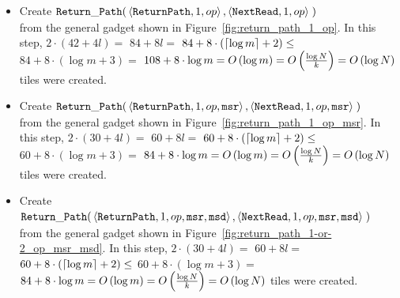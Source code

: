 \begin{itemize}

    \item Create
    $\begin{aligned}[t]
        \returnpath(& \left\langle {\tt ReturnPath}, 1, \inc \right\rangle,
                      \left\langle {\tt NextRead},   1, \inc \right\rangle \;)
    \end{aligned}$\\from the general gadget shown in Figure~\ref{fig:return_path_1_op}.
    In this step, $2 \cdot \left( 42 + 4l \right) =$
    $84 + 8l =$
    $84 + 8 \cdot \left( \ceil*{\log m} + 2 \right) \leq$
    $84 + 8 \cdot \left( {\log m} + 3 \right) =$
    $108 + 8 \cdot {\log m} = \bigologm$ tiles were created.
    \vspace{0.5cm}

    \item Create
    $\begin{aligned}[t]
        \returnpath(& \left\langle {\tt ReturnPath}, 1, \inc, {\tt msr} \right\rangle,
                      \left\langle {\tt NextRead},   1, \inc, {\tt msr} \right\rangle \;)
    \end{aligned}$\\from the general gadget shown in Figure~\ref{fig:return_path_1_op_msr}.
    In this step, $2 \cdot \left( 30 + 4l \right) =$
    $60 + 8l =$
    $60 + 8 \cdot \left( \ceil*{\log m} + 2 \right) \leq$
    $60 + 8 \cdot \left( {\log m} + 3 \right) =$
    $84 + 8 \cdot {\log m} = \bigologm$ tiles were created.
    \vspace{0.5cm}

    \item Create
    $\begin{aligned}[t]
        \returnpath(& \left\langle {\tt ReturnPath}, 1, \inc, {\tt msr}, {\tt msd} \right\rangle,
                      \left\langle {\tt NextRead},   1, \inc, {\tt msr}, {\tt msd} \right\rangle \;)
    \end{aligned}$\\from the general gadget shown in Figure~\ref{fig:return_path_1-or-2_op_msr_msd}.
    In this step, $2 \cdot \left( 30 + 4l \right) =$
    $60 + 8l =$
    $60 + 8 \cdot \left( \ceil*{\log m} + 2 \right) \leq$
    $60 + 8 \cdot \left( {\log m} + 3 \right) =$
    $84 + 8 \cdot {\log m} = \bigologm$ tiles were created.
    \vspace{0.5cm}


\end{itemize}
